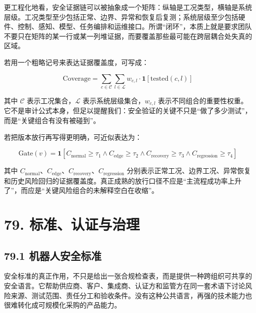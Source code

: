 更工程化地看，安全证据链可以被抽象成一个矩阵：纵轴是工况类型，横轴是系统层级。工况类型至少包括正常、边界、异常和恢复后复测；系统层级至少包括硬件、控制、感知、模型、任务编排和运维接口。所谓“闭环”，本质上就是要求团队不要只在矩阵的某一行或某一列堆证据，而要覆盖那些最可能在跨层耦合处失真的区域。

若用一个粗略记号来表达证据覆盖度，可写成：

\begingroup
\scriptsize
\begin{equation*}
\text{Coverage} = \sum_{c \in \mathcal{C}} \sum_{l \in \mathcal{L}} w_{c,l} \cdot \mathbf{1}[\text{tested}(c,l)]
\end{equation*}
\endgroup

其中 \(\mathcal{C}\) 表示工况集合，\(\mathcal{L}\) 表示系统层级集合，\(w_{c,l}\) 表示不同组合的重要性权重。它不是审计公式本身，但足以提醒我们：安全验证的关键不只是“做了多少测试”，而是“关键组合有没有被碰到”。

若把版本放行再写得更明确，可近似表达为：

\begingroup
\scriptsize
\begin{equation*}
\text{Gate}(v)=\mathbf{1}\!\left[
C_{\text{normal}}\!\ge\!\tau_1 \land
C_{\text{edge}}\!\ge\!\tau_2 \land
C_{\text{recovery}}\!\ge\!\tau_3 \land
C_{\text{regression}}\!\ge\!\tau_4
\right]
\end{equation*}
\endgroup

其中 \(C_{\text{normal}}\)、\(C_{\text{edge}}\)、\(C_{\text{recovery}}\)、\(C_{\text{regression}}\) 分别表示正常工况、边界工况、异常恢复和历史风险回归的证据覆盖度。真正成熟的放行口径不应是“主流程成功率上升了”，而应是“关键风险组合的未解释空白在收缩”。

\section*{79. 标准、认证与治理}

\subsection*{79.1 机器人安全标准}


安全标准的真正作用，不只是给出一张合规检查表，而是提供一种跨组织可共享的安全语言。它帮助供应商、客户、集成商、认证方和监管方在同一套术语下讨论风险来源、测试范围、责任分工和验收条件。没有这种公共语言，再强的技术能力也很难转化成可规模化采购的产品能力。

